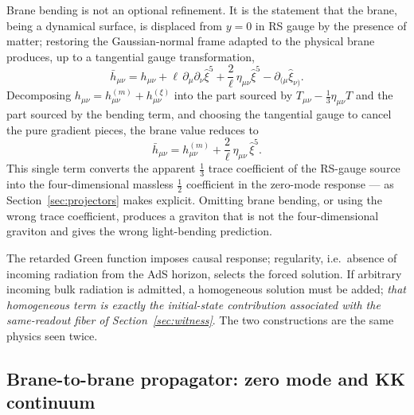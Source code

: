 \documentclass[11pt,a4paper]{article}
\theoremstyle{plain}
\theoremstyle{definition}
\begin{document}
Brane bending is not an optional refinement. It is the statement that
the brane, being a dynamical surface, is displaced from $y=0$ in RS gauge
by the presence of matter; restoring the Gaussian-normal frame adapted to
the physical brane produces, up to a tangential gauge transformation,
\begin{equation}
\label{eq:gaussnormal}
\bar h_{\mu\nu}
=h_{\mu\nu}
+\ell\,\partial_\mu\partial_\nu\hat\xi^5
+\frac{2}{\ell}\,\eta_{\mu\nu}\hat\xi^5
-\partial_{(\mu}\hat\xi_{\nu)} .
\end{equation}
Decomposing $h_{\mu\nu}=h^{(m)}_{\mu\nu}+h^{(\xi)}_{\mu\nu}$ into the
part sourced by $T_{\mu\nu}-\tfrac13\eta_{\mu\nu}T$ and the part sourced
by the bending term, and choosing the tangential gauge to cancel the pure
gradient pieces, the brane value reduces to
\begin{equation}
\label{eq:hbar}
\boxed{\;
\bar h_{\mu\nu}
=h^{(m)}_{\mu\nu}
+\frac{2}{\ell}\,\eta_{\mu\nu}\,\hat\xi^5 .
\;}
\end{equation}
This single term converts the apparent $\tfrac13$ trace coefficient of
the RS-gauge source into the four-dimensional massless $\tfrac12$
coefficient in the zero-mode response --- as Section~\ref{sec:projectors}
makes explicit. Omitting brane bending, or using the wrong trace
coefficient, produces a graviton that is not the four-dimensional
graviton and gives the wrong light-bending prediction.

The retarded Green function imposes causal response; regularity, i.e.\
absence of incoming radiation from the AdS horizon, selects the forced
solution. If arbitrary incoming bulk radiation is admitted, a homogeneous
solution must be added; \emph{that homogeneous term is exactly the
initial-state contribution associated with the same-readout fiber of
Section~\ref{sec:witness}}. The two constructions are the same physics
seen twice.

\subsection{Brane-to-brane propagator: zero mode and KK continuum}
\label{sec:propagator}
\end{document}
